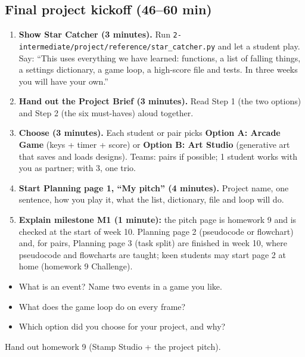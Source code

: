 \subsection{Final project kickoff (46--60 min)}
\begin{enumerate}[leftmargin=1.4em]
  \item \textbf{Show Star Catcher (3 minutes).} Run \texttt{2-intermediate/project/reference/star\_catcher.py} and let a student play.
        Say: \enquote{This uses everything we have learned: functions, a list of falling things, a settings dictionary, a game loop, a high-score file and tests.
        In three weeks you will have your own.}
  \item \textbf{Hand out the Project Brief (3 minutes).} Read Step 1 (the two options) and Step 2 (the six must-haves) aloud together.
  \item \textbf{Choose (3 minutes).} Each student or pair picks \textbf{Option A: Arcade Game} (keys + timer + score) or \textbf{Option B: Art Studio}
        (generative art that saves and loads designs). Teams: pairs if possible; 1 student works with you as partner; with 3, one trio.
  \item \textbf{Start Planning page 1, \enquote{My pitch} (4 minutes).} Project name, one sentence, how you play it, what the list, dictionary, file and loop will do.
  \item \textbf{Explain milestone M1 (1 minute):} the pitch page is homework 9 and is checked at the start of week 10. Planning page 2
        (pseudocode or flowchart) and, for pairs, Planning page 3 (task split) are finished in week 10, where pseudocode and flowcharts are taught;
        keen students may start page 2 at home (homework 9 Challenge).
\end{enumerate}

\begin{reflection}
\begin{itemize}[leftmargin=1.2em]
  \item What is an event? Name two events in a game you like.
  \item What does the game loop do on every frame?
  \item Which option did you choose for your project, and why?
\end{itemize}
\end{reflection}
Hand out homework 9 (Stamp Studio + the project pitch).

